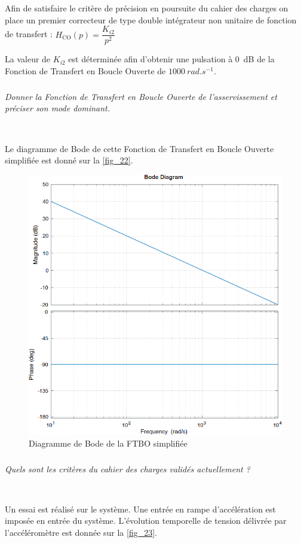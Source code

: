 \documentclass[10pt,fleqn]{article} %
\begin{document}
Afin de satisfaire le critère de précision en poursuite du cahier des charges on place un premier correcteur
de type double intégrateur non unitaire de fonction de transfert : $H_{\text{CO}}(p)=\dfrac{K_{i2}}{p^2}$

La valeur de $K_{i2}$ est déterminée afin d’obtenir une pulsation à \SI{0}{dB} de la Fonction de Transfert en Boucle
Ouverte de $\SI{1000}{rad.s^{-1}}$.

\subparagraph{\label{q_41}}\textit{Donner la Fonction de Transfert en Boucle Ouverte de l’asservissement et préciser son mode
dominant.}
\ifprof
\begin{corrige} ~\\

\end{corrige}
\else
\fi

Le diagramme de Bode de cette Fonction de Transfert en Boucle Ouverte simplifiée est donné sur la
\autoref{fig_22}.

\begin{figure}[H]
\centering
\includegraphics[width=0.7\linewidth]{fig_22}
\caption{Diagramme de Bode de la FTBO simplifiée \label{fig_22}}
\end{figure}


\subparagraph{\label{q_42}}\textit{Quels sont les critères du cahier des charges validés actuellement ?}
\ifprof
\begin{corrige} ~\\

\end{corrige}
\else
\fi

Un essai est réalisé sur le système. Une entrée en rampe d’accélération est imposée en entrée du système.
L’évolution temporelle de tension délivrée par l’accéléromètre est donnée sur la \autoref{fig_23}.
\end{document}
